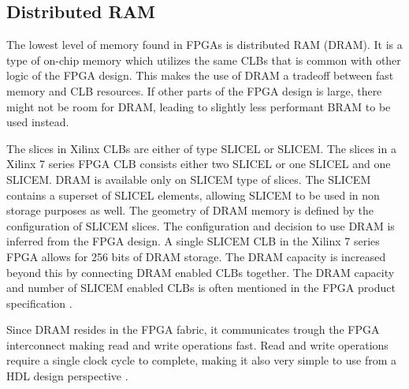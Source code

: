 \documentclass[12pt]{report}
\begin{document}
\subsection{Distributed RAM}
The lowest level of memory found in FPGAs is distributed RAM (DRAM). It is a type of on-chip memory which utilizes the same CLBs that is common with other logic of the FPGA design. This makes the use of DRAM a tradeoff between fast memory and CLB resources. If other parts of the FPGA design is large, there might not be room for DRAM, leading to slightly less performant BRAM to be used instead.
\par
The slices in Xilinx CLBs are either of type SLICEL or SLICEM. The slices in a Xilinx 7 series FPGA CLB consists either two SLICEL or one SLICEL and one SLICEM. DRAM is available only on SLICEM type of slices. The SLICEM contains a superset of SLICEL elements, allowing SLICEM to be used in non storage purposes as well. The geometry of DRAM memory is defined by the configuration of SLICEM slices. The configuration and decision to use DRAM is inferred from the FPGA design. A single SLICEM CLB in the Xilinx 7 series FPGA allows for 256 bits of DRAM storage. The DRAM capacity is increased beyond this by connecting DRAM enabled CLBs together. The DRAM capacity and number of SLICEM enabled CLBs is often mentioned in the FPGA product specification \citep{XilMemMan}. 
\par
Since DRAM resides in the FPGA fabric, it communicates trough the FPGA interconnect making read and write operations fast. Read and write operations require a single clock cycle to complete, making it also very simple to use from a HDL design perspective \citep{XilMemMan}.  
\end{document}
